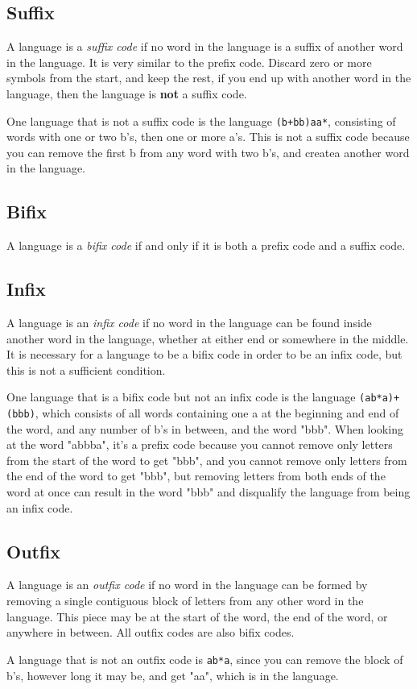 \documentclass{article}
\begin{document}
\subsection{Suffix}
A language is a \textit{suffix code} if no word in the language is a suffix of another word in the language. It is very similar to the prefix code. Discard zero or more symbols from the start, and keep the rest, if you end up with another word in the language, then the language is \textbf{not} a suffix code. 

\par One language that is not a suffix code is the language \verb-(b+bb)aa*-, consisting of words with one or two b's, then one or more a's. This is not a suffix code because you can remove the first b from any word with two b's, and createa another word in the language. 

\subsection{Bifix}
A language is a \textit{bifix code} if and only if it is both a prefix code and a suffix code. 

\subsection{Infix}
A language is an \textit{infix code} if no word in the language can be found inside another word in the language, whether at either end or somewhere in the middle. It is necessary for a language to be a bifix code in order to be an infix code, but this is not a sufficient condition. 

\par One language that is a bifix code but not an infix code is the language \verb-(ab*a)+(bbb)-, which consists of all words containing one a at the beginning and end of the word, and any number of b's in between, and the word "bbb". 
When looking at the word "abbba", it's a prefix code because you cannot remove only letters from the start of the word to get "bbb", and you cannot remove only letters from the end of the word to get "bbb", but removing letters from both ends of the word at once can result in the word "bbb" and disqualify the language from being an infix code. 

\subsection{Outfix}
A language is an \textit{outfix code} if no word in the language can be formed by removing a single contiguous block of letters from any other word in the language. This piece may be at the start of the word, the end of the word, or anywhere in between. All outfix codes are also bifix codes. 
\par A language that is not an outfix code is \verb-ab*a-, since you can remove the block of b's, however long it may be, and get "aa", which is in the language. 
\end{document}
